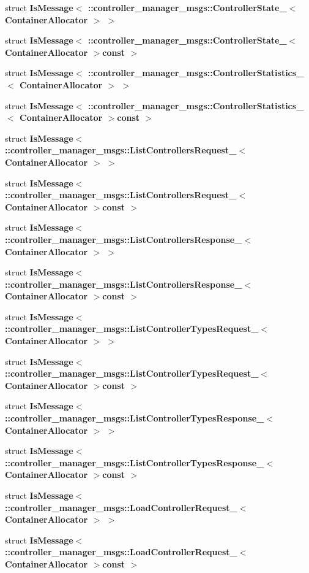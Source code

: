 \begin{DoxyCompactItemize}
\item 
struct {\bf \-Is\-Message$<$ \-::controller\-\_\-manager\-\_\-msgs\-::\-Controller\-State\-\_\-$<$ Container\-Allocator $>$ $>$}
\item 
struct {\bf \-Is\-Message$<$ \-::controller\-\_\-manager\-\_\-msgs\-::\-Controller\-State\-\_\-$<$ Container\-Allocator $>$const  $>$}
\item 
struct {\bf \-Is\-Message$<$ \-::controller\-\_\-manager\-\_\-msgs\-::\-Controller\-Statistics\-\_\-$<$ Container\-Allocator $>$ $>$}
\item 
struct {\bf \-Is\-Message$<$ \-::controller\-\_\-manager\-\_\-msgs\-::\-Controller\-Statistics\-\_\-$<$ Container\-Allocator $>$const  $>$}
\item 
struct {\bf \-Is\-Message$<$ \-::controller\-\_\-manager\-\_\-msgs\-::\-List\-Controllers\-Request\-\_\-$<$ Container\-Allocator $>$ $>$}
\item 
struct {\bf \-Is\-Message$<$ \-::controller\-\_\-manager\-\_\-msgs\-::\-List\-Controllers\-Request\-\_\-$<$ Container\-Allocator $>$const  $>$}
\item 
struct {\bf \-Is\-Message$<$ \-::controller\-\_\-manager\-\_\-msgs\-::\-List\-Controllers\-Response\-\_\-$<$ Container\-Allocator $>$ $>$}
\item 
struct {\bf \-Is\-Message$<$ \-::controller\-\_\-manager\-\_\-msgs\-::\-List\-Controllers\-Response\-\_\-$<$ Container\-Allocator $>$const  $>$}
\item 
struct {\bf \-Is\-Message$<$ \-::controller\-\_\-manager\-\_\-msgs\-::\-List\-Controller\-Types\-Request\-\_\-$<$ Container\-Allocator $>$ $>$}
\item 
struct {\bf \-Is\-Message$<$ \-::controller\-\_\-manager\-\_\-msgs\-::\-List\-Controller\-Types\-Request\-\_\-$<$ Container\-Allocator $>$const  $>$}
\item 
struct {\bf \-Is\-Message$<$ \-::controller\-\_\-manager\-\_\-msgs\-::\-List\-Controller\-Types\-Response\-\_\-$<$ Container\-Allocator $>$ $>$}
\item 
struct {\bf \-Is\-Message$<$ \-::controller\-\_\-manager\-\_\-msgs\-::\-List\-Controller\-Types\-Response\-\_\-$<$ Container\-Allocator $>$const  $>$}
\item 
struct {\bf \-Is\-Message$<$ \-::controller\-\_\-manager\-\_\-msgs\-::\-Load\-Controller\-Request\-\_\-$<$ Container\-Allocator $>$ $>$}
\item 
struct {\bf \-Is\-Message$<$ \-::controller\-\_\-manager\-\_\-msgs\-::\-Load\-Controller\-Request\-\_\-$<$ Container\-Allocator $>$const  $>$}

\end{DoxyCompactItemize}
